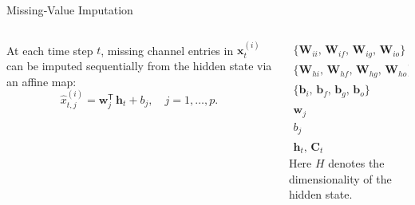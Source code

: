 \begin{frame}[t]{Missing‐Value Imputation}
	\begin{columns}[t]
		\begin{column}{0.55\textwidth}
			\begin{block}{}
				At each time step \(t\), missing channel entries in \(\boldsymbol{x}_t^{(i)}\) can be imputed sequentially from the hidden state via an affine map:
				\[
				\hat{x}_{t,j}^{(i)}
				= \boldsymbol{w}_j^{\mathsf T}\,\boldsymbol{h}_t + b_j,
				\quad j = 1,\dots,p.
				\]
			\end{block}

		\end{column}
		\begin{column}{0.45\textwidth}
			\[
			\begin{aligned}
				\{\boldsymbol{W}_{ii},\,\boldsymbol{W}_{if},\,\boldsymbol{W}_{ig},\,\boldsymbol{W}_{io}\}
				&\in \mathbb{R}^{H \times p},\\
				\{\boldsymbol{W}_{hi},\,\boldsymbol{W}_{hf},\,\boldsymbol{W}_{hg},\,\boldsymbol{W}_{ho}\}
				&\in \mathbb{R}^{H \times H},\\
				\{\boldsymbol{b}_{i},\,\boldsymbol{b}_{f},\,\boldsymbol{b}_{g},\,\boldsymbol{b}_{o}\}
				&\in \mathbb{R}^{H},\\
				\boldsymbol{w}_j &\in \mathbb{R}^{H},\\
				b_j &\in \mathbb{R},\\
				\boldsymbol{h}_t,\,\boldsymbol{C}_t &\in \mathbb{R}^{H}.
			\end{aligned}
			\]
			Here \(H\) denotes the dimensionality of the hidden state.
		\end{column}
	\end{columns}
\end{frame}

